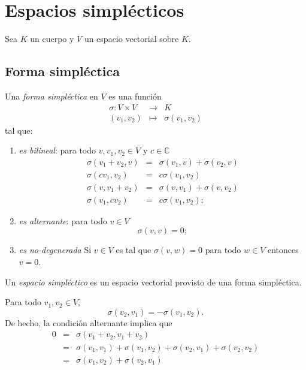 \chapter{Espacios simpl\'ecticos}

Sea $K$ un cuerpo y $V$ un espacio vectorial sobre $K$.

\section{Forma simpl\'ectica}

\begin{defn}
Una \emph{forma simpl\'ectica} en $V$ es una funci\'on
\begin{eqnarray*}
\sigma: V\times V & \longrightarrow & K\\
(v_1,v_2) & \longmapsto & \sigma(v_1,v_2)
\end{eqnarray*}
tal que:
\begin{enumerate}
\item \emph{es bilineal}: para todo $v,v_1,v_2\in V$ y $c\in\mathbb{C}$
\begin{eqnarray*}
\sigma(v_1+v_2,v) & = & \sigma(v_1,v)+\sigma(v_2,v)\\
\sigma(cv_1,v_2) & = & c\sigma(v_1,v_2)\\
\sigma(v,v_1+v_2) & = & \sigma(v,v_1) + \sigma(v,v_2)\\
\sigma(v_1,cv_2) & = & c\sigma(v_1,v_2);
\end{eqnarray*}
\item \emph{es alternante}: para todo $v\in V$
\[
\sigma(v,v)=0;
\]
\item \emph{es no-degenerada} Si $v\in V$ es tal que $\sigma(v,w)=0$ para todo $w\in V$ entonces $v=0$.
\end{enumerate}
Un \emph{espacio simpl\'ectico} es un espacio vectorial provisto de una forma simpl\'ectica. 
\end{defn}

\begin{obs}
Para todo $v_1,v_2\in V$, 
\[
\sigma(v_2,v_1)=-\sigma(v_1,v_2).
\]
De hecho, la condici\'on alternante implica que
\begin{eqnarray*}
0 & = & \sigma(v_1+v_2,v_1+v_2)\\
   & = & \sigma(v_1,v_1)+\sigma(v_1,v_2)+\sigma(v_2,v_1)+\sigma(v_2,v_2)\\
   & = & \sigma(v_1,v_2)+\sigma(v_2,v_1)
\end{eqnarray*}
\end{obs}

